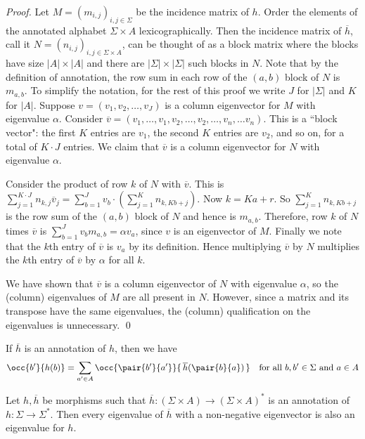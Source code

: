\begin{proof}
  Let $M = (m_{i,j})_{i,j \in \Sigma}$ be the incidence matrix of $h$. 
  Order the elements of the annotated alphabet $\Sigma \times A$ lexicographically. 
  Then the incidence matrix of $\overline{h}$, call it $N = (n_{i,j})_{i,j \in \Sigma \times A}$, can be thought of 
  as a block matrix where the blocks have size $|A| \times |A|$ and there are $|\Sigma| \times |\Sigma|$ such blocks in $N$. 
  Note that by the definition of annotation, the row sum in each row of the $(a,b)$ block of $N$ is $m_{a,b}$.
  To simplify the notation, for the rest of this proof we write $J$ for $|\Sigma|$ and $K$ for $|A|$.
  Suppose $v = (v_1, v_2, \ldots, v_{J})$ is a column eigenvector for $M$ with eigenvalue $\alpha$. 
  Consider
  $\overline{v} = (v_1, \ldots, v_1, v_2, \ldots, v_2, \ldots, v_n, \ldots v_n)$. 
  This  is a ``block vector":  the first $K$ entries are $v_1$, the second $K$ entries are $v_2$, and so on,
  for a total of $K\cdot J$ entries. We claim that $\overline{v}$ is a column eigenvector for $N$ with eigenvalue $\alpha$.

  Consider the product of row $k$ of $N$ with $\overline{v}$. This is 
  $\sum_{j = 1}^{K\cdot J} n_{k,j}\overline{v}_j =  \sum_{b = 1}^{J} v_b\cdot(\sum_{j=1}^{K}n_{k,Kb + j})$.
Now  $k = Ka + r$.
  So $\sum_{j=1}^{K} n_{k, Kb + j}$ is the row sum of the $(a, b)$ block of $N$ and hence is $m_{a,b}$. Therefore, row $k$ of $N$ times $\overline{v}$ is $\sum_{b = 1}^{J} v_b m_{a, b} = \alpha v_a$,
  since $v$ is an eigenvector of $M$. Finally we note that 
  the $k$th entry of $\overline{v}$ is $v_a$ by its definition. Hence multiplying $\overline{v}$ by $N$ multiplies the $k$th entry of $\overline{v}$ by $\alpha$ for all $k$. 

  We have shown  that $\overline{v}$ is a column eigenvector of $N$ with eigenvalue $\alpha$, so the (column) eigenvalues of $M$ are all present in $N$. However, since a matrix and its transpose have the same eigenvalues, the (column) qualification on the eigenvalues is unnecessary.
  \qed
\end{proof}

If $\overline{h}$ is an annotation of $h$, then we have 
\begin{align}
  \occ{b'}{h(b)} = \sum_{a'\in A} \occ{\pair{b'}{a'}}{\,\overline{h}(\pair{b}{a})\,}
  &&\text{for all $b,b'\in\Sigma$ and $a \in A$} \label{eq:sub:sum}
\end{align}

\begin{lemma}\label{lem:oh:h}
  Let $h,\overline{h}$ be morphisms such that $\overline{h} : (\Sigma \times A) \to (\Sigma \times A)^*$
  is an annotation of $h : \Sigma \to \Sigma^*$.
  Then every eigenvalue of $\overline{h}$ with a non-negative eigenvector is also an eigenvalue for $h$.
\end{lemma}

